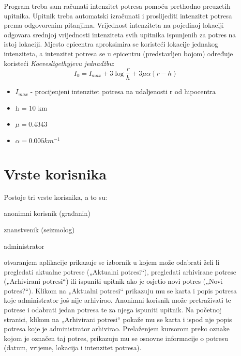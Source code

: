 	Program treba sam računati intenzitet potresa pomoću prethodno preuzetih upitnika. Upitnik treba automatski izračunati i proslijediti intenzitet potresa prema odgovorenim pitanjima. 
	Vrijednost intenziteta na pojedinoj lokaciji odgovara srednjoj vrijednosti intenziteta svih upitnika ispunjenih za potres na istoj lokaciji. Mjesto epicentra aproksimira se koristeći lokacije jednakog intenziteta, a intenzitet potresa se u epicentru (predstavljen bojom) određuje koristeći \textit{Koevesligethyjevu jednadžbu}:
\begin{equation}
  I_{0} = I_{max} + 3\log\frac{r}{h} + 3\mu\alpha(r-h)
\end{equation}

\begin{itemize}                                                             
    \item $I_{max}$ - procijenjeni intenzitet potresa na udaljenosti r od hipocentra
    \item h = 10 km 
    \item $\mu=0.4343$
    \item $\alpha=0.005 km^{-1}$
    
\end{itemize} 


\section{Vrste korisnika}
Postoje tri vrste korisnika, a to su:
\begin{packed_item}
	\item anonimni korisnik (građanin)
	\item znanstvenik (seizmolog)
	\item administrator
\end{packed_item}

 otvaranjem aplikacije prikazuje se izbornik u kojem može odabrati želi li pregledati aktualne potrese („Aktualni potresi“), pregledati arhivirane potrese („Arhivirani potresi“) ili ispuniti upitnik ako je osjetio novi potres („Novi potres?“). Klikom na „Aktualni potresi“ prikazuju mu se karta i popis potresa koje administrator još nije arhivirao. Anonimni korisnik može pretraživati te potrese i odabrati jedan potresa te za njega ispuniti upitnik. Na početnoj stranici, klikom na „Arhivirani potresi“ pokaže mu se karta i ispod nje popis potresa koje je administrator arhivirao. Prelaženjem kursorom preko oznake kojom je označen taj potres, prikazuju mu se osnovne informacije o potresu (datum, vrijeme, lokacija i intenzitet potresa).

